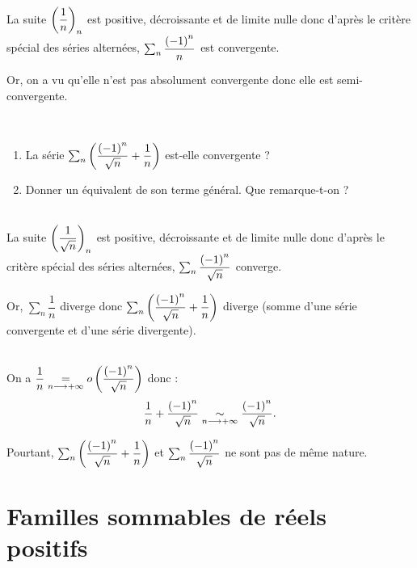 \begin{dem}~\\
La suite \(\left(\dfrac{1}{n}\right)_n\) est positive, décroissante et de limite nulle donc d'après le critère spécial des séries alternées, \(\sum_n\dfrac{\left(-1\right)^n}{n}\) est convergente.

Or, on a vu qu'elle n'est pas absolument convergente donc elle est semi-convergente.
\end{dem}

\begin{exoex}~\\
\begin{enumerate}
    \item La série \(\sum_n\left(\dfrac{\left(-1\right)^n}{\sqrt{n}}+\dfrac{1}{n}\right)\) est-elle convergente ? \\
    \item Donner un équivalent de son terme général. Que remarque-t-on ?
\end{enumerate}
\end{exoex}

\begin{corr}[1]~\\
La suite \(\left(\dfrac{1}{\sqrt{n}}\right)_n\) est positive, décroissante et de limite nulle donc d'après le critère spécial des séries alternées, \(\sum_n\dfrac{\left(-1\right)^n}{\sqrt{n}}\) converge.

Or, \(\sum_n\dfrac{1}{n}\) diverge donc \(\sum_n\left(\dfrac{\left(-1\right)^n}{\sqrt{n}}+\dfrac{1}{n}\right)\) diverge (somme d'une série convergente et d'une série divergente).
\end{corr}

\begin{corr}[2]~\\
On a \(\dfrac{1}{n}\underset{n\longrightarrow+\infty}{=}o\left(\dfrac{\left(-1\right)^n}{\sqrt{n}}\right)\) donc : \[\dfrac{1}{n}+\dfrac{\left(-1\right)^n}{\sqrt{n}}\underset{n\longrightarrow+\infty}{\sim}\dfrac{\left(-1\right)^n}{\sqrt{n}}.\]

Pourtant, \(\sum_n\left(\dfrac{\left(-1\right)^n}{\sqrt{n}}+\dfrac{1}{n}\right)\) et \(\sum_n\dfrac{\left(-1\right)^n}{\sqrt{n}}\) ne sont pas de même nature.
\end{corr}

\section{Familles sommables de réels positifs}\label{sec:famillesSommablesDeRéelsPositifs}

